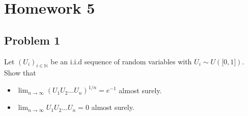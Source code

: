 \chapter{Homework 5}\label{homework-5}

\section{Problem 1}\label{hw05-problem-1}

Let \(\left( \mathit{U}_{\mathit{i}} \right)_{\mathit{i} \in \mathbb{N}}\) be an i.i.d sequence of random variables with \(\mathit{U}_{\mathit{i}} \sim \mathit{U}(\lbrack 0,1\rbrack)\). Show that

\begin{itemize}
\item
  \(\lim_{\mathit{n}\rightarrow\infty}\left( {\mathit{U}_{1}\mathit{U}_{2}\ldots\mathit{U}_{\mathit{n}}} \right)^{1/\mathit{n}} = \mathit{e}^{- 1}\) almost surely.
\item
  \(\lim_{\mathit{n}\rightarrow\infty}\mathit{U}_{1}\mathit{U}_{2}\ldots\mathit{U}_{\mathit{n}} = 0\) almost surely.
\end{itemize}

